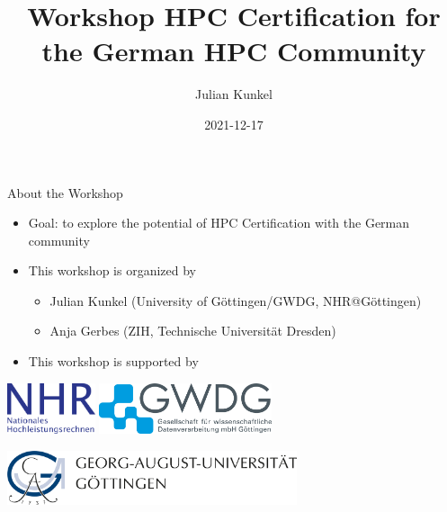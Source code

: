 \documentclass[compress,aspectratio=169]{beamer}
\subtitle{}
\title{\Large Workshop HPC Certification for the German HPC Community}
\author{Julian Kunkel}
\date{2021-12-17}
\institute{Institute for Computer Science / GWDG}
\begin{document}
\begin{frame}[plain]{}
	\maketitle
\end{frame}

\begin{frame}{About the Workshop}
  \begin{itemize}
  \item Goal: to explore the potential of HPC Certification with the German community
  \item This workshop is organized by
  \begin{itemize}
    \item Julian Kunkel (University of Göttingen/GWDG, NHR@Göttingen)
    \item Anja Gerbes (ZIH, Technische Universität Dresden)
  \end{itemize}
    
  \item This workshop is supported by 
  \end{itemize}
  \includegraphics[height=1.5cm]{NHR} \qquad
  \includegraphics[height=1.5cm]{gwdg-logo} 
  
  \smallskip
  
  \includegraphics[height=1.593cm]{Uni_Goettingen-Logo_4c_RGB-600dpi}
\end{frame}
\end{document}
